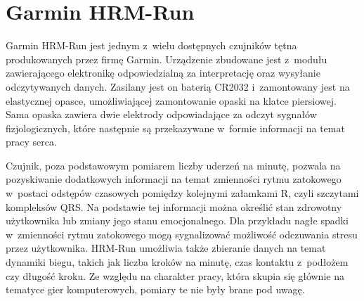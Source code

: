 \section{Garmin HRM-Run}
Garmin HRM-Run jest jednym z~wielu dostępnych czujników tętna produkowanych przez firmę Garmin. Urządzenie zbudowane jest z~modułu zawierającego elektronikę odpowiedzialną za interpretację oraz wysyłanie odczytywanych danych. Zasilany jest on baterią CR2032 i~zamontowany jest na elastycznej opasce, umożliwiającej zamontowanie opaski na klatce piersiowej. Sama opaska zawiera dwie elektrody odpowiadające za odczyt sygnałów fizjologicznych, które następnie są przekazywane w~formie informacji na temat pracy serca. 

Czujnik, poza podstawowym pomiarem liczby uderzeń na minutę, pozwala na pozyskiwanie dodatkowych informacji na temat zmienności rytmu zatokowego w~postaci odstępów czasowych pomiędzy kolejnymi załamkami R, czyli szczytami kompleksów QRS. Na podstawie tej informacji można określić stan zdrowotny użytkownika lub zmiany jego stanu emocjonalnego. Dla przykładu nagłe spadki w~zmienności rytmu zatokowego mogą sygnalizować możliwość odczuwania stresu przez użytkownika. HRM-Run umożliwia także zbieranie danych na temat dynamiki biegu, takich jak liczba kroków na minutę, czas kontaktu z~podłożem czy długość kroku. Ze względu na charakter pracy, która skupia się głównie na tematyce gier komputerowych, pomiary te nie były brane pod uwagę. 


